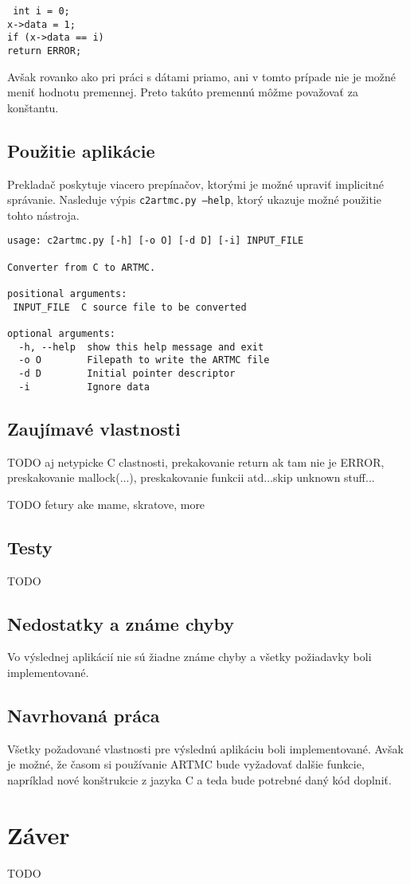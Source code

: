 \noindent
\texttt{
\tab int i = 0;\\
\tab x->data = 1;\\
\tab if (x->data == i)\\
\tab \tab return ERROR;\\
}

Avšak rovanko ako pri práci s dátami priamo, ani v tomto prípade nie je možné meniť hodnotu premennej. Preto takúto premennú môžme považovať za konštantu.

\section{Použitie aplikácie}
Prekladač poskytuje viacero prepínačov, ktorými je možné upraviť implicitné správanie.  Nasleduje výpis \texttt{c2artmc.py --help}, ktorý ukazuje možné použitie tohto nástroja.
\begin{verbatim}
usage: c2artmc.py [-h] [-o O] [-d D] [-i] INPUT_FILE

Converter from C to ARTMC.

positional arguments:
 INPUT_FILE  C source file to be converted

optional arguments:
  -h, --help  show this help message and exit
  -o O        Filepath to write the ARTMC file
  -d D        Initial pointer descriptor
  -i          Ignore data
\end{verbatim}

\section{Zaujímavé vlastnosti}
\label{sec_features}

TODO aj netypicke C clastnosti, prekakovanie return ak tam nie je ERROR, preskakovanie mallock(...), preskakovanie funkcii atd...skip unknown stuff...

TODO fetury ake mame, skratove, more

\section{Testy}
TODO

\section{Nedostatky a známe chyby}
Vo výslednej aplikácií nie sú žiadne známe chyby a všetky požiadavky boli implementované.

\section{Navrhovaná práca}
Všetky požadované vlastnosti pre výslednú aplikáciu boli implementované. Avšak je možné, že časom si používanie ARTMC bude vyžadovať dalšie funkcie, napríklad nové konštrukcie z jazyka C a teda bude potrebné daný kód doplniť. 

\chapter{Záver}
TODO
